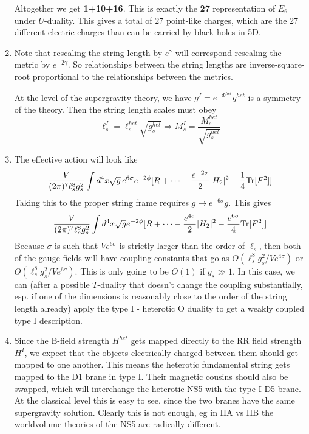 \documentclass[11pt, class=article, crop=false]{standalone}
\begin{document}
\begin{enumerate}
	Altogether we get \textbf{1+10+16}. This is exactly the \textbf{27} representation of $E_6$ under $U$-duality. This gives a total of $27$ point-like charges, which are the 27 different electric charges than can be carried by black holes in 5D.
	
	\item Note that rescaling the string length by $e^\gamma$ will correspond rescaling the metric by $e^{-2\gamma}$. So relationships between the string lengths are inverse-square-root proportional to the relationships between the metrics.
	
	At the level of the supergravity theory, we have $g^I = e^{-\Phi^{het}} g^{het}$ is a symmetry of the theory. Then the string length scales must obey
	\[
		\ell^I_s = \ell^{het}_s \sqrt{g^{het}_s} \Rightarrow M^I_s = \frac{M^{het}_s}{\sqrt{g^{het}_s}}
	\] 
	
	\item The effective action will look like
	\[
		\frac{V}{(2\pi)^7 \ell_s^8 g_s^2} \int d^4 x \sqrt{g}\, e^{6 \sigma} e^{-2\phi} [R + \dots - \frac{e^{-2 \sigma}}{2} |H_2|^2 - \frac{1}{4} \mathrm{Tr}[F^2]]
	\]
	Taking this to the proper string frame requires $g \to e^{-6\sigma} g$. This gives 
	\[
		\frac{V}{(2\pi)^7 \ell_s^8 g_s^2}\int d^4 x \sqrt{g} e^{-2\phi} [R + \dots - \frac{e^{4 \sigma}}{2} |H_2|^2 - \frac{e^{6 \sigma}}{4} \mathrm{Tr}[F^2]]
	\]
	Because $\sigma$ is such that $V e^{6 \sigma}$ is strictly larger than the order of $\ell_s$, then both of the gauge fields will have coupling constants that go as $O(\ell_s^8 g_s^2/V e^{4 \sigma})$ or $O(\ell_s^8 g_s^2/V e^{6 \sigma})$. This is only going to be $O(1)$ if $g_s \gg 1$. In this case, we can (after a possible $T$-duality that doesn't change the coupling substantially, esp. if one of the dimensions is reasonably close to the order of the string length already) apply the type I - heterotic O duality to get a weakly coupled type I description. 

	\item Since the B-field strength $H^{het}$ gets mapped directly to the RR field strength $H^{I}$, we expect that the objects electrically charged between them should get mapped to one another. This means the heterotic fundamental string gets mapped to the D1 brane in type I. Their magnetic cousins should also be swapped, which will interchange the heterotic NS5 with the type I D5 brane. 
	At the classical level this is easy to see, since the two branes have the same supergravity solution. Clearly this is not enough, eg in IIA vs IIB the worldvolume theories of the NS5 are radically different.
	

\end{enumerate}
\end{document}
